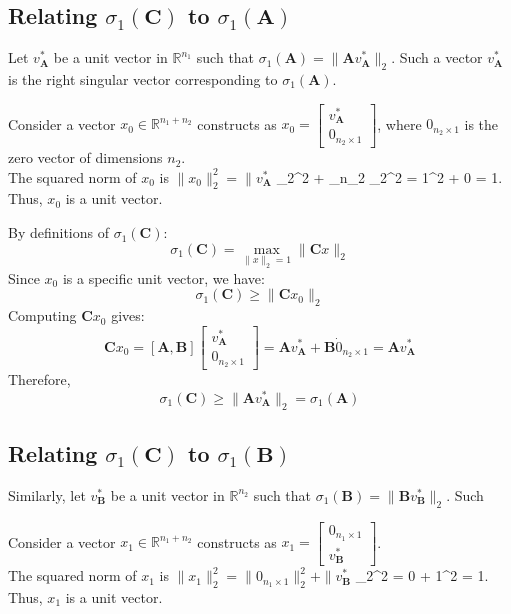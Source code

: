 \subsection{Relating $\sigma_1(\mathbf{C})$ to $\sigma_1(\mathbf{A})$}
\label{sec:bigger-than-A}
Let $v_{\mathbf{A}}^*$ be a unit vector in $\mathbb{R}^{n_1}$ such that
$\sigma_1(\mathbf{A}) = \parallel \mathbf{A}v_{\mathbf{A}}^* \parallel_2$. Such
a vector $v_{\mathbf{A}}^*$ is the right singular vector corresponding to
$\sigma_1(\mathbf{A})$.

Consider a vector $x_0 \in \mathbb{R}^{n_1 + n_2}$ constructs as $x_0 =
\begin{bmatrix} v_{\mathbf{A}}^* \\ 0_{n_2 \times 1} \end{bmatrix}$, where
$0_{n_2 \times 1}$ is the zero vector of dimensions $n_2$.\\
The squared norm of $x_0$ is $\parallel x_0 \parallel_2^2 = \parallel
v_{\mathbf{A}}^*$ \parallel_2^2 + _{n_2 } \parallel_2^2 = 1^2
+ 0  = 1. Thus, $x_0$ is a unit vector.

By definitions of $\sigma_1(\mathbf{C})$:
\[ \sigma_1(\mathbf{C}) = \max_{\parallel x \parallel_2 = 1} \parallel
\mathbf{C}x \parallel_2 \]
Since $x_0$ is a specific unit vector, we have:
\[ \sigma_1(\mathbf{C}) \geq \parallel \mathbf{C}x_0 \parallel_2 \]
Computing $\mathbf{C}x_0$ gives:
\[ \mathbf{C}x_0 = [\mathbf{A}, \mathbf{B}] \begin{bmatrix} v_{\mathbf{A}}^* \\
0_{n_2 \times 1} \end{bmatrix} = \mathbf{A}v_{\mathbf{A}}^* + \mathbf{B} \dot
0_{n_2 \times 1} = \mathbf{A}v_{\mathbf{A}}^* \]
Therefore,
\[ \sigma_1(\mathbf{C}) \geq \parallel \mathbf{A}v_{\mathbf{A}}^* \parallel_2 =
\sigma_1(\mathbf{A})\]

\subsection{Relating $\sigma_1(\mathbf{C})$ to $\sigma_1(\mathbf{B})$}
\label{sec:bigger-than-B}
Similarly, let $v_{\mathbf{B}}^*$ be a unit vector in $\mathbb{R}^{n_2}$ such that
$\sigma_1(\mathbf{B}) = \parallel \mathbf{B}v_{\mathbf{B}}^* \parallel_2$. Such

Consider a vector $x_1 \in \mathbb{R}^{n_1 + n_2}$ constructs as $x_1 =
\begin{bmatrix} 0_{n_1 \times 1} \\ v_{\mathbf{B}}^* \end{bmatrix}$.\\
The squared norm of $x_1$ is $\parallel x_1 \parallel_2^2 = \parallel 0_{n_1
\times 1} \parallel_2^2 + \parallel v_{\mathbf{B}}^*$ \parallel_2^2 = 0 + 1^2 =
1. Thus, $x_1$ is a unit vector.

